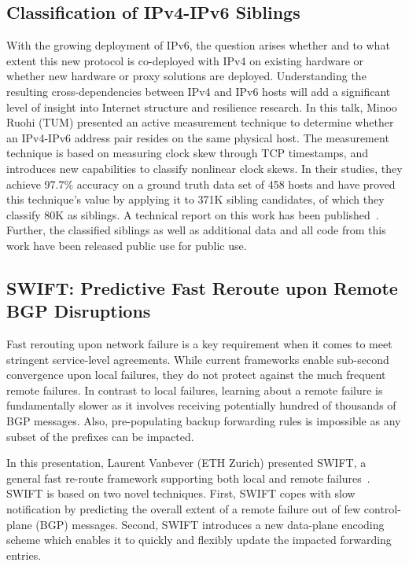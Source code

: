\subsection{Classification of IPv4-IPv6 Siblings}

With the growing deployment of IPv6, the question arises whether and to what
extent this new protocol is co-deployed with IPv4 on existing hardware or
whether new hardware or proxy solutions are deployed. Understanding the
resulting cross-dependencies between IPv4 and IPv6 hosts will add a
significant level of insight into Internet structure and resilience research.
In this talk, Minoo Ruohi (TUM) presented an active measurement technique to
determine whether an IPv4-IPv6 address pair resides on the same physical host.
The measurement technique is based on measuring clock skew through TCP
timestamps, and introduces new capabilities to classify nonlinear clock skews.
In their studies, they achieve 97.7\% accuracy on a ground truth data set of
458 hosts and have proved this technique's value by applying it to 371K
sibling candidates, of which they classify 80K as siblings. A technical report
on this work has been published~\cite{Scheitle2016}. Further, the classified
siblings as well as additional data and all code from this work have been
released public use \cite{qscheitle:arxiv:2016} for public use.


\subsection{SWIFT: Predictive Fast Reroute upon Remote BGP Disruptions}

Fast rerouting upon network failure is a key requirement when it comes to meet
stringent service-level agreements. While current frameworks enable sub-second
convergence upon local failures, they do not protect against the much frequent
remote failures. In contrast to local failures, learning about a remote
failure is fundamentally slower as it involves receiving potentially hundred
of thousands of BGP messages. Also, pre-populating backup forwarding rules is
impossible as any subset of the prefixes can be impacted.

In this presentation, Laurent Vanbever (ETH Zurich) presented SWIFT, a general
fast re-route framework supporting both local and remote failures~\cite{}.
SWIFT is based on two novel techniques. First, SWIFT copes with slow
notification by predicting the overall extent of a remote failure out of few
control-plane (BGP) messages. Second, SWIFT introduces a new data-plane
encoding scheme which enables it to quickly and flexibly update the impacted
forwarding entries.

